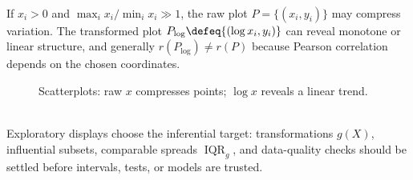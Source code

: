 \begin{example} \label{ex:scale-can-hide-relationship-in-scatterplot} \\
If $x_i>0$ and $\max_i x_i/\min_i x_i\gg1$, the raw plot $P=\{(x_i,y_i)\}$ may compress variation. The transformed plot $P_{\log}\defeq\{(\log x_i,y_i)\}$ can reveal monotone or linear structure, and generally $r(P_{\log})\neq r(P)$ because Pearson correlation depends on the chosen coordinates.
\end{example}

\begin{figure}[H]
  \centering
  
  \caption{Scatterplots: raw $x$ compresses points; $\log x$ reveals a linear trend.}
  \label{fig:eda-scatterplot-scale-change}
\end{figure}

\begin{remark} \label{rem:exploratory-displays-before-inference} \\
Exploratory displays choose the inferential target: transformations $g(X)$, influential subsets, comparable spreads $\operatorname{IQR}_g$, and data-quality checks should be settled before intervals, tests, or models are trusted.
\end{remark}
